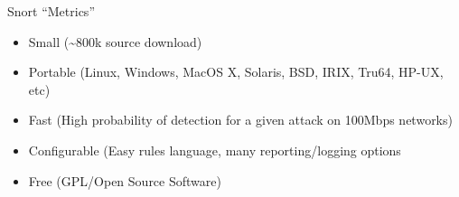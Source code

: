 \begin{frame}[t]{Snort ``Metrics''}
  \fontsize{17}{20.5}\selectfont
  \vspace{0.2cm}
  \begin{itemize}
    \item Small (\textasciitilde800k source download)
    \item Portable (Linux, Windows, MacOS X, Solaris, BSD, IRIX, Tru64, HP-UX, etc)
    \item Fast (High probability of detection for a given attack on 100Mbps networks)
    \item Configurable (Easy rules language, many reporting/logging options
    \item Free (GPL/Open Source Software)
  \end{itemize}
\end{frame}
